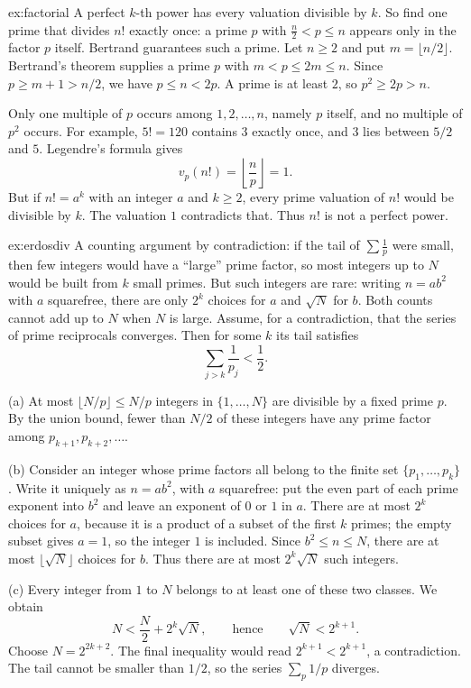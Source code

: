 \begin{solution}{ex:factorial}
\idea A perfect $k$-th power has every valuation divisible by $k$. So find one prime that divides $n!$ exactly once: a prime $p$ with $\frac n2<p\le n$ appears only in the factor $p$ itself. Bertrand guarantees such a prime.
\writeup Let $n\ge2$ and put $m=\lfloor n/2\rfloor$. Bertrand's theorem supplies a prime $p$ with $m<p\le2m\le n$. Since $p\ge m+1>n/2$, we have $p\le n<2p$. A prime is at least $2$, so $p^2\ge2p>n$.

Only one multiple of $p$ occurs among $1,2,\ldots,n$, namely $p$ itself, and no multiple of $p^2$ occurs. For example, $5!=120$ contains $3$ exactly once, and $3$ lies between $5/2$ and $5$. Legendre's formula gives
\[
v_p(n!)=\left\lfloor\frac np\right\rfloor=1.
\]
But if $n!=a^k$ with an integer $a$ and $k\ge2$, every prime valuation of $n!$ would be divisible by $k$. The valuation $1$ contradicts that. Thus $n!$ is not a perfect power.
\end{solution}

\begin{solution}{ex:erdosdiv}
\idea A counting argument by contradiction: if the tail of $\sum\frac1p$ were small, then few integers would have a ``large'' prime factor, so most integers up to $N$ would be built from $k$ small primes. But such integers are rare: writing $n=ab^2$ with $a$ squarefree, there are only $2^k$ choices for $a$ and $\sqrt N$ for $b$. Both counts cannot add up to $N$ when $N$ is large.
\writeup Assume, for a contradiction, that the series of prime reciprocals converges. Then for some $k$ its tail satisfies
\[
\sum_{j>k}\frac1{p_j}<\frac12.
\]

(a) At most $\lfloor N/p\rfloor\le N/p$ integers in $\{1,\ldots,N\}$ are divisible by a fixed prime $p$. By the union bound, fewer than $N/2$ of these integers have any prime factor among $p_{k+1},p_{k+2},\ldots$.

(b) Consider an integer whose prime factors all belong to the finite set $\{p_1,\ldots,p_k\}$. Write it uniquely as $n=ab^2$, with $a$ squarefree: put the even part of each prime exponent into $b^2$ and leave an exponent of $0$ or $1$ in $a$. There are at most $2^k$ choices for $a$, because it is a product of a subset of the first $k$ primes; the empty subset gives $a=1$, so the integer $1$ is included. Since $b^2\le n\le N$, there are at most $\lfloor\sqrt N\rfloor$ choices for $b$. Thus there are at most $2^k\sqrt N$ such integers.

(c) Every integer from $1$ to $N$ belongs to at least one of these two classes. We obtain
\[
N<\frac N2+2^k\sqrt N,
\qquad\text{hence}\qquad
\sqrt N<2^{k+1}.
\]
Choose $N=2^{2k+2}$. The final inequality would read $2^{k+1}<2^{k+1}$, a contradiction. The tail cannot be smaller than $1/2$, so the series $\sum_p1/p$ diverges.
\end{solution}

